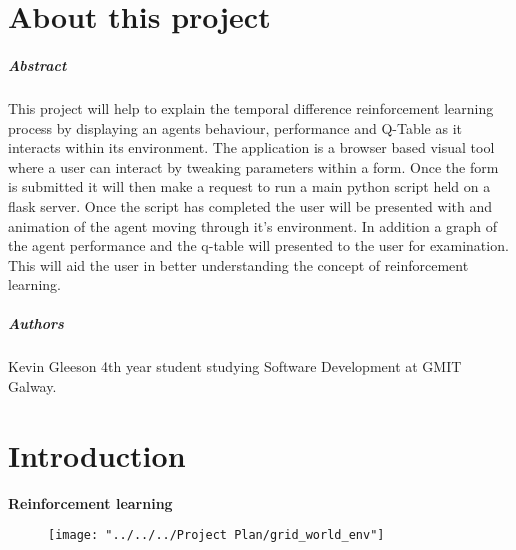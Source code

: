 
\chapter*{About this project}
\paragraph{Abstract}

This project will help to explain the temporal difference reinforcement learning process by displaying an agents behaviour, performance and Q-Table as it interacts within its environment. The application is a browser based visual tool where a user can interact by tweaking parameters within a form. Once the form is submitted it will then make a request to run a main python script held on a flask server. Once the script has completed the user will be presented with and animation of the agent moving through it's environment. In addition a graph of the agent performance and the q-table will presented to the user for examination. This will aid the user in better understanding the concept of reinforcement learning.

\paragraph{Authors}
Kevin Gleeson 4th year student studying Software Development at GMIT Galway.



\chapter{Introduction}
\textbf{Reinforcement learning}\\
\begin{figure}[H]
	\centering
	\texttt{[image: "../../../Project Plan/grid\_world\_env"]}
	\caption{}
	\label{fig:gridworldenv}
\end{figure}

